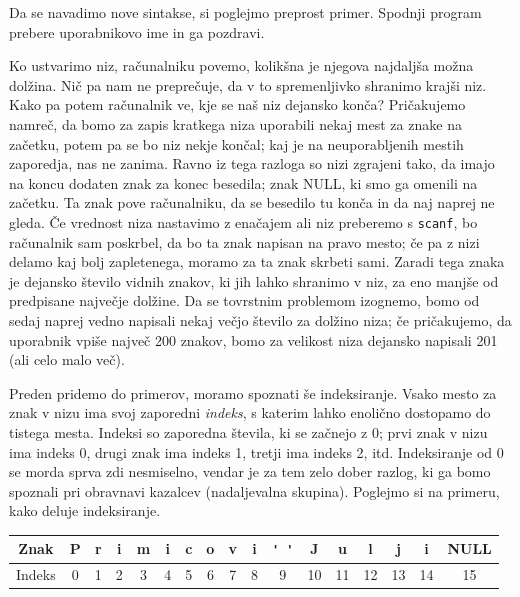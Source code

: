 \documentclass{book}
\begin{document}
\begin{examples}
  Da se navadimo nove sintakse, si poglejmo preprost primer.
  Spodnji program prebere uporabnikovo ime in ga pozdravi.
\end{examples}

Ko ustvarimo niz, računalniku povemo, kolikšna je njegova najdaljša možna
dolžina.
Nič pa nam ne preprečuje, da v to spremenljivko shranimo krajši niz.
Kako pa potem računalnik ve, kje se naš niz dejansko konča?
Pričakujemo namreč, da bomo za zapis kratkega niza uporabili nekaj mest za znake
na začetku, potem pa se bo niz nekje končal; kaj je na neuporabljenih mestih
zaporedja, nas ne zanima.
Ravno iz tega razloga so nizi zgrajeni tako, da imajo na koncu dodaten znak za
konec besedila; znak NULL, ki smo ga omenili na začetku.
Ta znak pove računalniku, da se besedilo tu konča in da naj naprej ne gleda.
Če vrednost niza nastavimo z enačajem ali niz preberemo s \verb+scanf+, bo
računalnik sam poskrbel, da bo ta znak napisan na pravo mesto; če pa z nizi
delamo kaj bolj zapletenega, moramo za ta znak skrbeti sami.
Zaradi tega znaka je dejansko število vidnih znakov, ki jih lahko shranimo v
niz, za eno manjše od predpisane največje dolžine.
Da se tovrstnim problemom izognemo, bomo od sedaj naprej vedno napisali nekaj
večjo število za dolžino niza; če pričakujemo, da uporabnik vpiše največ 200
znakov, bomo za velikost niza dejansko napisali 201 (ali celo malo več).

Preden pridemo do primerov, moramo spoznati še indeksiranje.
Vsako mesto za znak v nizu ima svoj zaporedni \textit{indeks}, s katerim
lahko enolično dostopamo do tistega mesta.
Indeksi so zaporedna števila, ki se začnejo z 0; prvi znak v nizu ima indeks 0,
drugi znak ima indeks 1, tretji ima indeks 2, itd.
Indeksiranje od 0 se morda sprva zdi nesmiselno, vendar je za tem zelo dober
razlog, ki ga bomo spoznali pri obravnavi kazalcev (nadaljevalna skupina).
Poglejmo si na primeru, kako deluje indeksiranje.

\vspace{0.5cm}

\begin{tabular}[h!]{|c|cccccccccccccccc|}
  Znak & P & r & i & m & i & c & o & v & i & \verb+' '+  & J & u & l & j & i & NULL \\
  \hline
  Indeks & 0 & 1 & 2 & 3 & 4 & 5 & 6 & 7 & 8 & 9 & 10 & 11 & 12 & 13 & 14 & 15 \\
\end{tabular}
\end{document}
